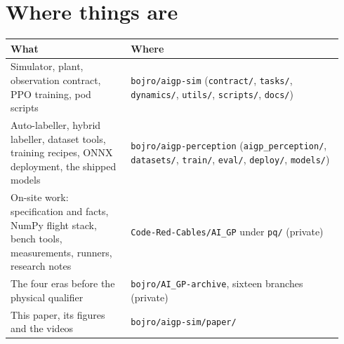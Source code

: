 \documentclass{article}
\begin{document}
\section{Where things are}
\begin{table}[htbp]\centering\small
\begin{tabular}{@{}p{0.34\linewidth}p{0.60\linewidth}@{}}
\toprule
What & Where \\ \midrule
Simulator, plant, observation contract, PPO training, pod scripts & \texttt{bojro/aigp-sim} (\texttt{contract/}, \texttt{tasks/}, \texttt{dynamics/}, \texttt{utils/}, \texttt{scripts/}, \texttt{docs/}) \\
Auto-labeller, hybrid labeller, dataset tools, training recipes, ONNX deployment, the shipped models & \texttt{bojro/aigp-perception} (\texttt{aigp\_perception/}, \texttt{datasets/}, \texttt{train/}, \texttt{eval/}, \texttt{deploy/}, \texttt{models/}) \\
On-site work: specification and facts, NumPy flight stack, bench tools, measurements, runners, research notes & \texttt{Code-Red-Cables/AI\_GP} under \texttt{pq/} (private) \\
The four eras before the physical qualifier & \texttt{bojro/AI\_GP-archive}, sixteen branches (private) \\
This paper, its figures and the videos & \texttt{bojro/aigp-sim/paper/} \\
\bottomrule
\end{tabular}
\end{table}
\end{document}
